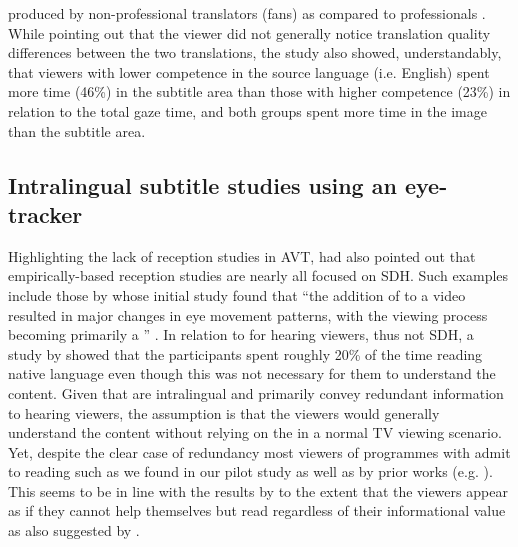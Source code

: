 \documentclass[output=paper]{langsci/langscibook}
\begin{document}
produced by non-professional translators (fans) as compared to professionals \citep{orrego2014}. While pointing out that the viewer did not generally notice translation quality differences between the two translations, the study also showed, understandably, that viewers with lower competence in the source language (i.e. English) spent more time (46\%) in the subtitle area than those with higher competence (23\%) in relation to the total gaze time, and both groups spent more time in the image than the subtitle area.


\subsection{Intralingual subtitle studies using an eye-tracker}

Highlighting the lack of reception studies in AVT, \citet[30]{gambier2008} had also pointed out that empirically-based reception studies are nearly all focused on SDH.  Such examples include those by \citep{jensema2000a, jensema2000b} whose initial study found that ``the addition of  to a video resulted in major changes in eye movement patterns, with the viewing process becoming primarily a '' \citep[275]{jensema2000a}. In relation to  for hearing viewers, thus not SDH, a study by \citet{dydewalle1991} showed that the participants spent roughly 20\% of the time reading native language  even though this was not necessary for them to understand the content. Given that  are intralingual and primarily convey redundant information to hearing viewers, the assumption is that the viewers would generally understand the content without relying on the  in a normal TV viewing scenario. Yet, despite the clear case of redundancy most viewers of programmes with  admit to reading such  as we found in our pilot study as well as by prior works (e.g. \citealt{Kimura2000}). This seems to be in line with the results by \citet{dydewalle1991} to the extent that the viewers appear as if they cannot help themselves but read  regardless of their informational value as also suggested by \citet{bisson2014}. 
\end{document}
